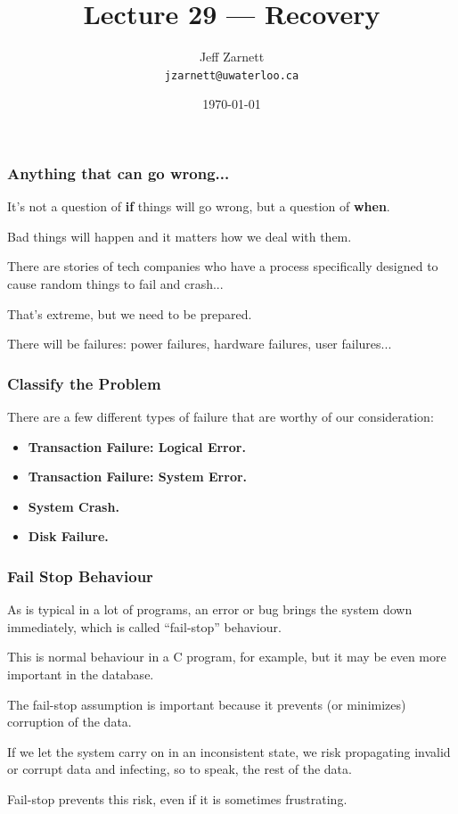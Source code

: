 

\title{Lecture 29 --- Recovery }

\author{Jeff Zarnett \\ \small \texttt{jzarnett@uwaterloo.ca}}
\date{\today}




\begin{frame}
  \titlepage

 \end{frame}


\begin{frame}
\frametitle{Anything that can go wrong...}

It's not a question of \textbf{if} things will go wrong, but a question of \textbf{when}. 

Bad things will happen and it matters how we deal with them. 

There are stories of tech companies who have a process specifically designed to cause random things to fail and crash... 

That's extreme, but we need to be prepared. 

There will be failures: power failures, hardware failures, user failures...


\end{frame}

\begin{frame}
\frametitle{Classify the Problem}

There are a few different types of failure that are worthy of our consideration:

\begin{itemize}
	\item \textbf{Transaction Failure: Logical Error.} 
	\item \textbf{Transaction Failure: System Error.} 
	\item \textbf{System Crash.} 
	\item \textbf{Disk Failure.} 
\end{itemize}

\end{frame}

\begin{frame}
\frametitle{Fail Stop Behaviour}

As is typical in a lot of programs, an error or bug brings the system down immediately, which is called ``fail-stop'' behaviour. 

This is normal behaviour in a C program, for example, but it may be even more important in the database. 

The fail-stop assumption is important because it prevents (or minimizes) corruption of the data. 

If we let the system carry on in an inconsistent state, we risk propagating invalid or corrupt data and infecting, so to speak, the rest of the data. 

Fail-stop prevents this risk, even if it is sometimes frustrating.


\end{frame}

